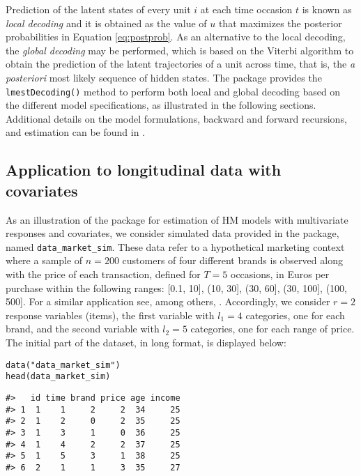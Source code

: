Prediction of the latent states of every unit \(i\) at each time occasion
\(t\) is known as \emph{local decoding} and it is obtained as the value of \(u\)
that maximizes the posterior probabilities in Equation
\eqref{eq:postprob}. As an alternative to the local decoding, the \emph{global
decoding} may be performed, which is based on the Viterbi algorithm
\citep{vite:67, juan:rabi:91} to obtain the prediction of the latent
trajectories of a unit across time, that is, the \emph{a posteriori} most
likely sequence of hidden states. The package provides the
\texttt{lmestDecoding()} method to perform both local and global decoding based
on the different model specifications, as illustrated in the following
sections. Additional details on the model formulations, backward and
forward recursions, and estimation can be found in
\cite{bart:farc:penn:13}.

\hypertarget{subsec:HMapp}{%
\subsection{Application to longitudinal data with covariates}\label{subsec:HMapp}}

As an illustration of the  package for estimation of HM
models with multivariate responses and covariates, we consider simulated
data provided in the package, named \texttt{data\_market\_sim}. These data refer
to a hypothetical marketing context where a sample of \(n=200\) customers
of four different brands is observed along with the price of each
transaction, defined for \(T=5\) occasions, in Euros per purchase within
the following ranges: {[}0.1, 10{]}, (10, 30{]}, (30, 60{]}, (30, 100{]}, (100,
500{]}. For a similar application see, among others,
\cite{paas:verm:bijm:07, bass:penn:ross:21}. Accordingly, we consider \(r=2\) response
variables (items), the first variable with \(l_1=4\) categories, one for
each brand, and the second variable with \(l_2=5\) categories, one for
each range of price. The initial part of the dataset, in long format, is
displayed below:

\begin{verbatim}
data("data_market_sim")
head(data_market_sim)
\end{verbatim}

\begin{verbatim}
#>   id time brand price age income
#> 1  1    1     2     2  34     25
#> 2  1    2     0     2  35     25
#> 3  1    3     1     0  36     25
#> 4  1    4     2     2  37     25
#> 5  1    5     3     1  38     25
#> 6  2    1     1     3  35     27
\end{verbatim}

